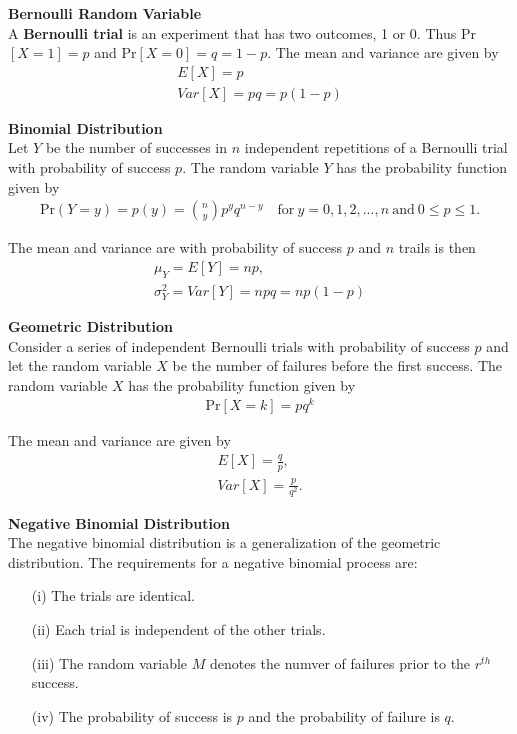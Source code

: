 \documentclass{article}
\numberwithin{theorem}{subsection}
\numberwithin{theorem}{subsubsection}
\theoremstyle{definition}
\numberwithin{definition}{subsection}
\numberwithin{definition}{subsubsection}
\begin{document}
\noindent \textbf{Bernoulli Random Variable}\\
\indent A \textbf{Bernoulli trial} is an experiment that has two outcomes, 1 or 0. Thus Pr$[X=1] = p$ and Pr$[X = 0] = q = 1 - p$. The mean and variance are given by
\begin{gather*}
    E[X] = p\\
    Var[X] = pq = p(1-p)
\end{gather*}

\noindent \textbf{Binomial Distribution} \\
\indent Let $Y$ be the number of successes in $n$ independent repetitions of a Bernoulli trial with probability of success $p$. The random variable $Y$ has the probability function given by
\begin{gather*}
    \text{Pr}(Y=y) = p(y) = {n \choose y}p^{y}q^{n-y} \quad \text{for}\ y=0,1,2,...,n\ \text{and}\ 0 \leq p \leq 1.
\end{gather*}

\noindent The mean and variance are with probability of success $p$ and $n$ trails is then
\begin{gather*}
    \mu_{Y} = E[Y] = np,\\
    \sigma_{Y}^{2} = Var[Y] = npq = np(1-p)
\end{gather*}

\noindent \textbf{Geometric Distribution} \\
\indent Consider a series of independent Bernoulli trials with probability of success $p$ and let the random variable $X$ be the number of failures before the first success. The random variable $X$ has the probability function given by
\begin{gather*}
    \text{Pr}[X=k] = pq^k
\end{gather*}

\noindent The mean and variance are given by
\begin{gather*}
    E[X] = \frac{q}{p}, \\
    Var[X] = \frac{p}{q^2}.
\end{gather*}

\noindent \textbf{Negative Binomial Distribution} \\
\indent The negative binomial distribution is a generalization of the geometric distribution. The requirements for a negative binomial process are:
\begin{itemize}
    \item[(i)] The trials are identical.
    \item[(ii)] Each trial is independent of the other trials.
    \item[(iii)] The random variable $M$ denotes the numver of failures prior to the $r^{th}$ success.
    \item[(iv)]  The probability of success is $p$ and the probability of failure is $q$.
\end{itemize}
\end{document}
